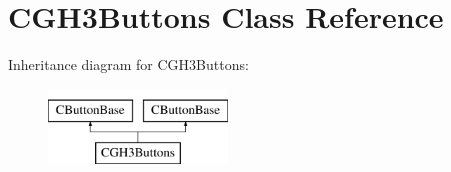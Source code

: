 \hypertarget{class_c_g_h3_buttons}{\section{C\-G\-H3\-Buttons Class Reference}
\label{class_c_g_h3_buttons}
}
Inheritance diagram for C\-G\-H3\-Buttons\-:\begin{figure}[H]
\begin{center}
\leavevmode
\includegraphics[height=2.000000cm]{class_c_g_h3_buttons}
\end{center}
\end{figure}
